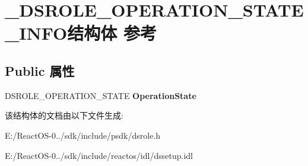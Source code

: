\hypertarget{struct___d_s_r_o_l_e___o_p_e_r_a_t_i_o_n___s_t_a_t_e___i_n_f_o}{}\section{\+\_\+\+D\+S\+R\+O\+L\+E\+\_\+\+O\+P\+E\+R\+A\+T\+I\+O\+N\+\_\+\+S\+T\+A\+T\+E\+\_\+\+I\+N\+F\+O结构体 参考}
\label{struct___d_s_r_o_l_e___o_p_e_r_a_t_i_o_n___s_t_a_t_e___i_n_f_o}
\subsection*{Public 属性}
\begin{DoxyCompactItemize}
\item 
\mbox{\label{struct___d_s_r_o_l_e___o_p_e_r_a_t_i_o_n___s_t_a_t_e___i_n_f_o_a598fc28191e5f1edf03c0db942cc6521}} 
D\+S\+R\+O\+L\+E\+\_\+\+O\+P\+E\+R\+A\+T\+I\+O\+N\+\_\+\+S\+T\+A\+TE {\bfseries Operation\+State}
\end{DoxyCompactItemize}


该结构体的文档由以下文件生成\+:\begin{DoxyCompactItemize}
\item 
E\+:/\+React\+O\+S-\/0../sdk/include/psdk/dsrole.\+h\item 
E\+:/\+React\+O\+S-\/0../sdk/include/reactos/idl/dssetup.\+idl\end{DoxyCompactItemize}
